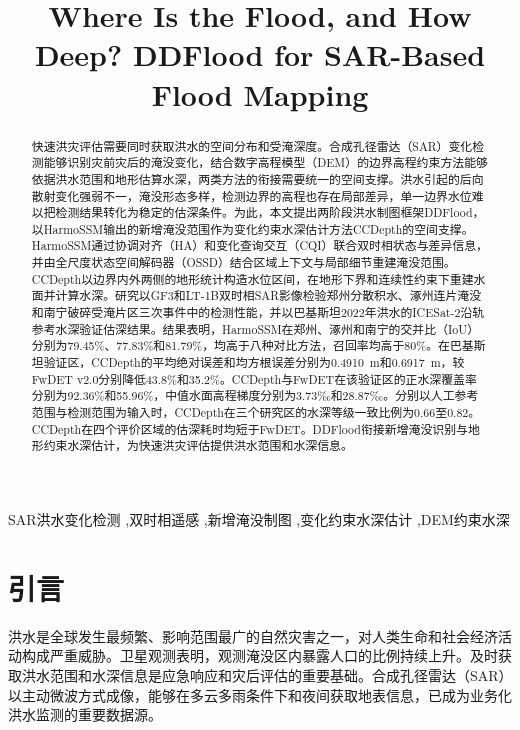 \documentclass[authoryear,preprint,12pt]{elsarticle}
\begin{document}
\doublespacing
{}
\pagestyle{plain}

\begin{frontmatter}

\title{Where Is the Flood, and How Deep? DDFlood for SAR-Based Flood Mapping}

\author{}

\begin{abstract}

快速洪灾评估需要同时获取洪水的空间分布和受淹深度。合成孔径雷达（SAR）变化检测能够识别灾前灾后的淹没变化，结合数字高程模型（DEM）的边界高程约束方法能够依据洪水范围和地形估算水深，两类方法的衔接需要统一的空间支撑。洪水引起的后向散射变化强弱不一，淹没形态多样，检测边界的高程也存在局部差异，单一边界水位难以把检测结果转化为稳定的估深条件。为此，本文提出两阶段洪水制图框架DDFlood，以HarmoSSM输出的新增淹没范围作为变化约束水深估计方法CCDepth的空间支撑。HarmoSSM通过协调对齐（HA）和变化查询交互（CQI）联合双时相状态与差异信息，并由全尺度状态空间解码器（OSSD）结合区域上下文与局部细节重建淹没范围。CCDepth以边界内外两侧的地形统计构造水位区间，在地形下界和连续性约束下重建水面并计算水深。研究以GF3和LT-1B双时相SAR影像检验郑州分散积水、涿州连片淹没和南宁破碎受淹片区三次事件中的检测性能，并以巴基斯坦2022年洪水的ICESat-2沿轨参考水深验证估深结果。结果表明，HarmoSSM在郑州、涿州和南宁的交并比（IoU）分别为79.45\%、77.83\%和81.79\%，均高于八种对比方法，召回率均高于80\%。在巴基斯坦验证区，CCDepth的平均绝对误差和均方根误差分别为0.4910~m和0.6917~m，较FwDET v2.0分别降低43.8\%和35.2\%。CCDepth与FwDET在该验证区的正水深覆盖率分别为92.36\%和55.96\%，中值水面高程梯度分别为3.73‰和28.87‰。分别以人工参考范围与检测范围为输入时，CCDepth在三个研究区的水深等级一致比例为0.66至0.82。CCDepth在四个评价区域的估深耗时均短于FwDET。DDFlood衔接新增淹没识别与地形约束水深估计，为快速洪灾评估提供洪水范围和水深信息。

\end{abstract}

\begin{keyword}
SAR洪水变化检测 \sep 双时相遥感 \sep 新增淹没制图 \sep 变化约束水深估计 \sep DEM约束水深
\end{keyword}

\end{frontmatter}

\section{引言}

洪水是全球发生最频繁、影响范围最广的自然灾害之一，对人类生命和社会经济活动构成严重威胁\citep{credUndrr2020disasters}。卫星观测表明，观测淹没区内暴露人口的比例持续上升\citep{tellman2021exposure}。及时获取洪水范围和水深信息是应急响应和灾后评估的重要基础。合成孔径雷达（SAR）以主动微波方式成像，能够在多云多雨条件下和夜间获取地表信息，已成为业务化洪水监测的重要数据源\citep{wagner2026gfm}。
\end{document}
